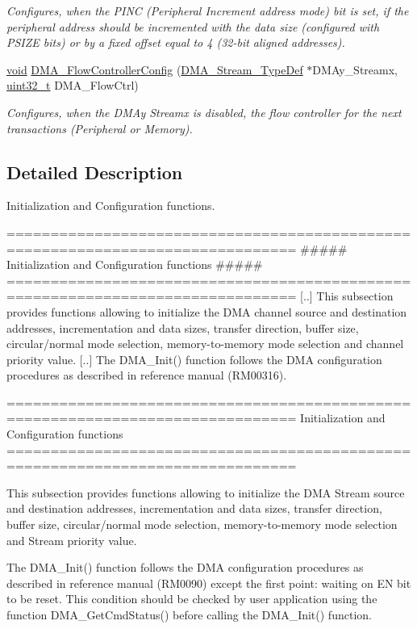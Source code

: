 \begin{DoxyCompactItemize}
\begin{DoxyCompactList}\small\item\em Configures, when the P\-I\-N\-C (Peripheral Increment address mode) bit is set, if the peripheral address should be incremented with the data size (configured with P\-S\-I\-Z\-E bits) or by a fixed offset equal to 4 (32-\/bit aligned addresses). \end{DoxyCompactList}\item 
\hyperlink{group___n_a_m_e_ga18028b8badbf1ea7e704ccac3c488e82}{void} \hyperlink{group___d_m_a___group1_ga77f7628f6be9d6d088127eceb090b8b2}{D\-M\-A\-\_\-\-Flow\-Controller\-Config} (\hyperlink{struct_d_m_a___stream___type_def}{D\-M\-A\-\_\-\-Stream\-\_\-\-Type\-Def} $\ast$D\-M\-Ay\-\_\-\-Streamx, \hyperlink{stdint_8h_a435d1572bf3f880d55459d9805097f62}{uint32\-\_\-t} D\-M\-A\-\_\-\-Flow\-Ctrl)
\begin{DoxyCompactList}\small\item\em Configures, when the D\-M\-Ay Streamx is disabled, the flow controller for the next transactions (Peripheral or Memory). \end{DoxyCompactList}\end{DoxyCompactItemize}


\subsection{Detailed Description}
Initialization and Configuration functions. \begin{DoxyVerb} ===============================================================================
              ##### Initialization and Configuration functions #####
 ===============================================================================
    [..] This subsection provides functions allowing to initialize the DMA channel 
         source and destination addresses, incrementation and data sizes, transfer 
         direction, buffer size, circular/normal mode selection, memory-to-memory 
         mode selection and channel priority value.
    [..] The DMA_Init() function follows the DMA configuration procedures as described 
         in reference manual (RM00316).\end{DoxyVerb}


\begin{DoxyVerb} ===============================================================================
                 Initialization and Configuration functions
 ===============================================================================  

  This subsection provides functions allowing to initialize the DMA Stream source
  and destination addresses, incrementation and data sizes, transfer direction, 
  buffer size, circular/normal mode selection, memory-to-memory mode selection 
  and Stream priority value.
  
  The DMA_Init() function follows the DMA configuration procedures as described in
  reference manual (RM0090) except the first point: waiting on EN bit to be reset.
  This condition should be checked by user application using the function DMA_GetCmdStatus()
  before calling the DMA_Init() function.\end{DoxyVerb}
 

